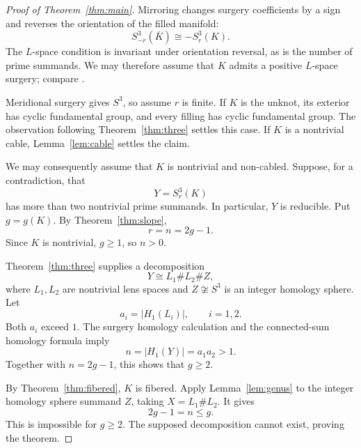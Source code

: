 \documentclass[11pt]{article}
\newcommand{\surg}[2]{S^3_{#1}(#2)}
\begin{document}
\begin{proof}[Proof of Theorem~\ref{thm:main}]
Mirroring changes surgery coefficients by a sign and reverses the
orientation of the filled manifold:
\[
    \surg{-r}{\overline K}\cong-\surg{r}{K}.
\]
The \(L\)-space condition is invariant under orientation reversal,
as is the number of prime summands. We may therefore assume that
\(K\) admits a positive \(L\)-space surgery; compare
\cite[Section~1]{HLZ}.

Meridional surgery gives \(S^3\), so assume \(r\) is finite.
If \(K\) is the unknot, its exterior has cyclic fundamental group,
and every filling has cyclic fundamental group. The observation
following Theorem~\ref{thm:three} settles this case.
If \(K\) is a nontrivial cable, Lemma~\ref{lem:cable} settles the
claim.

We may consequently assume that \(K\) is nontrivial and non-cabled.
Suppose, for a contradiction, that
\[
    Y=\surg{r}{K}
\]
has more than two nontrivial prime summands. In particular, \(Y\) is
reducible. Put \(g=g(K)\). By Theorem~\ref{thm:slope},
\[
    r=n=2g-1.
\]
Since \(K\) is nontrivial, \(g\geq 1\), so \(n>0\).

Theorem~\ref{thm:three} supplies a decomposition
\[
    Y\cong L_1\#L_2\# Z,
\]
where \(L_1,L_2\) are nontrivial lens spaces and \(Z\not\cong S^3\)
is an integer homology sphere. Let
\[
    a_i=|H_1(L_i)|,\qquad i=1,2.
\]
Both \(a_i\) exceed \(1\). The surgery homology calculation and the
connected-sum homology formula imply
\[
    n=|H_1(Y)|=a_1a_2>1.
\]
Together with \(n=2g-1\), this shows that \(g\geq 2\).

By Theorem~\ref{thm:fibered}, \(K\) is fibered.
Apply Lemma~\ref{lem:genus} to the integer homology sphere summand
\(Z\), taking \(X=L_1\#L_2\). It gives
\[
    2g-1=n\leq g.
\]
This is impossible for \(g\geq 2\). The supposed decomposition cannot
exist, proving the theorem.
\end{proof}
\end{document}
